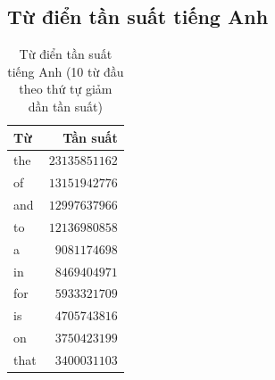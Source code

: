 \subsection*{Từ điển tần suất tiếng Anh}
\begin{table}[htb]
    \centering
    \caption{Từ điển tần suất tiếng Anh (10 từ đầu theo thứ tự giảm dần tần suất)}
    \begin{tabular}{l r}
        \toprule
        \textbf{Từ} & \textbf{Tần suất} \\\midrule
        the         & $23135851162$     \\
        of          & $13151942776$     \\
        and         & $12997637966$     \\
        to          & $12136980858$     \\
        a           & $9081174698$      \\
        in          & $8469404971$      \\
        for         & $5933321709$      \\
        is          & $4705743816$      \\
        on          & $3750423199$      \\
        that        & $3400031103$      \\
        \bottomrule
    \end{tabular}
\end{table}

\newpage
